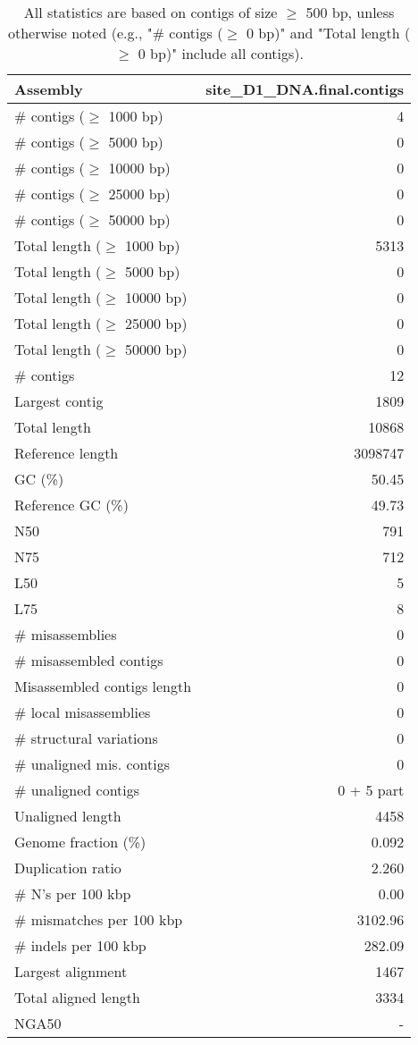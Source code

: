 \documentclass[12pt,a4paper]{article}
\begin{document}
\begin{table}[ht]
\begin{center}
\caption{All statistics are based on contigs of size $\geq$ 500 bp, unless otherwise noted (e.g., "\# contigs ($\geq$ 0 bp)" and "Total length ($\geq$ 0 bp)" include all contigs).}
\begin{tabular}{|l*{1}{|r}|}
\hline
Assembly & site\_D1\_DNA.final.contigs \\ \hline
\# contigs ($\geq$ 1000 bp) & 4 \\ \hline
\# contigs ($\geq$ 5000 bp) & 0 \\ \hline
\# contigs ($\geq$ 10000 bp) & 0 \\ \hline
\# contigs ($\geq$ 25000 bp) & 0 \\ \hline
\# contigs ($\geq$ 50000 bp) & 0 \\ \hline
Total length ($\geq$ 1000 bp) & 5313 \\ \hline
Total length ($\geq$ 5000 bp) & 0 \\ \hline
Total length ($\geq$ 10000 bp) & 0 \\ \hline
Total length ($\geq$ 25000 bp) & 0 \\ \hline
Total length ($\geq$ 50000 bp) & 0 \\ \hline
\# contigs & 12 \\ \hline
Largest contig & 1809 \\ \hline
Total length & 10868 \\ \hline
Reference length & 3098747 \\ \hline
GC (\%) & 50.45 \\ \hline
Reference GC (\%) & 49.73 \\ \hline
N50 & 791 \\ \hline
N75 & 712 \\ \hline
L50 & 5 \\ \hline
L75 & 8 \\ \hline
\# misassemblies & 0 \\ \hline
\# misassembled contigs & 0 \\ \hline
Misassembled contigs length & 0 \\ \hline
\# local misassemblies & 0 \\ \hline
\# structural variations & 0 \\ \hline
\# unaligned mis. contigs & 0 \\ \hline
\# unaligned contigs & 0 + 5 part \\ \hline
Unaligned length & 4458 \\ \hline
Genome fraction (\%) & 0.092 \\ \hline
Duplication ratio & 2.260 \\ \hline
\# N's per 100 kbp & 0.00 \\ \hline
\# mismatches per 100 kbp & 3102.96 \\ \hline
\# indels per 100 kbp & 282.09 \\ \hline
Largest alignment & 1467 \\ \hline
Total aligned length & 3334 \\ \hline
NGA50 & - \\ \hline
\end{tabular}
\end{center}
\end{table}
\end{document}
